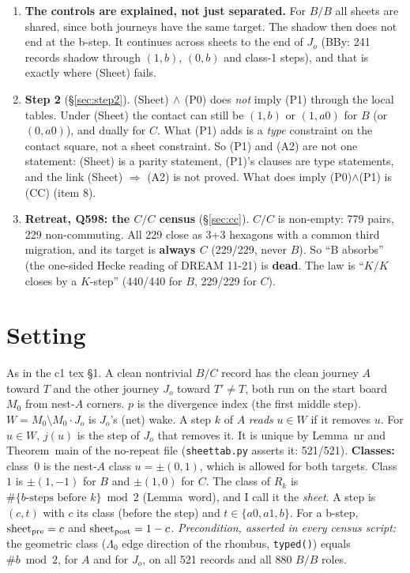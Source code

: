 \documentclass[11pt]{article}
\theoremstyle{definition}\newtheorem{definition}[theorem]{Definition}\newtheorem{remark}[theorem]{Remark}
\begin{document}
\begin{enumerate}
\item \textbf{The controls are explained, not just separated.} For $B/B$ all sheets are shared, since both journeys have the same target. The shadow then does not end at the b-step. It continues across sheets to the end of $J_o$ (BBy: 241 records shadow through $(1,b)$, $(0,b)$ and class-1 steps), and that is exactly where (Sheet) fails.
\item \textbf{Step 2} (\S\ref{sec:step2}). (Sheet)$\,\wedge\,$(P0) does \emph{not} imply (P1) through the local tables. Under (Sheet) the contact can still be $(1,b)$ or $(1,a0)$ for $B$ (or $(0,a0)$), and dually for $C$. What (P1) adds is a \emph{type} constraint on the contact square, not a sheet constraint. So (P1) and (A2) are not one statement: (Sheet) is a parity statement, (P1)'s clauses are type statements, and the link (Sheet) $\Rightarrow$ (A2) is not proved. What does imply (P0)$\wedge$(P1) is (CC) (item 8).
\item \textbf{Retreat, Q598: the $C/C$ census} (\S\ref{sec:cc}). $C/C$ is non-empty: 779 pairs, 229 non-commuting. All 229 close as 3+3 hexagons with a common third migration, and its target is \textbf{always $C$} (229/229, never $B$). So ``B absorbs'' (the one-sided Hecke reading of DREAM 11-21) is \textbf{dead}. The law is ``$K/K$ closes by a $K$-step'' (440/440 for $B$, 229/229 for $C$).
\end{enumerate}

\section{Setting}\label{sec:set}
As in the c1 tex \S1. A clean nontrivial $B/C$ record has the clean journey $A$ toward $T$ and the other journey $J_o$ toward $T'\ne T$, both run on the start board $M_0$ from nest-$A$ corners. $p$ is the divergence index (the first middle step).
$W=M_0\setminus M_0\cdot J_o$ is $J_o$'s (net) wake. A step $k$ of $A$ \emph{reads} $u\in W$ if it removes $u$. For $u\in W$, $j(u)$ is the step of $J_o$ that removes it. It is unique by Lemma~nr and Theorem~main of the no-repeat file (\texttt{sheettab.py} asserts it: 521/521).
\textbf{Classes:} class~$0$ is the nest-$A$ class $u=\pm(0,1)$, which is allowed for both targets. Class~$1$ is $\pm(1,-1)$ for $B$ and $\pm(1,0)$ for $C$. The class of $R_k$ is $\#\{b\text{-steps before }k\}\bmod2$ (Lemma~word), and I call it the \emph{sheet}. A step is $(c,t)$ with $c$ its class (before the step) and $t\in\{a0,a1,b\}$. For a b-step, $\mathrm{sheet}_{\rm pre}=c$ and $\mathrm{sheet}_{\rm post}=1-c$.
\emph{Precondition, asserted in every census script:} the geometric class ($\Lambda_0$ edge direction of the rhombus, \texttt{typed()}) equals $\#b\bmod2$, for $A$ and for $J_o$, on all 521 records and all 880 $B/B$ roles.
\end{document}
